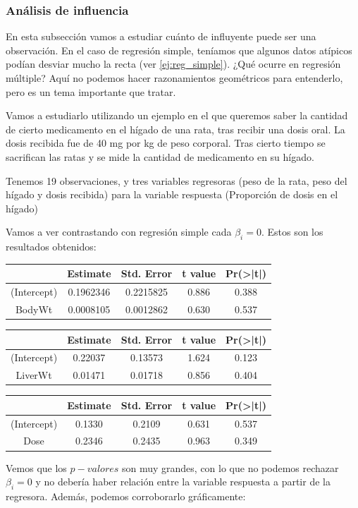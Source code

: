 \subsubsection{Análisis de influencia}

En esta subsección vamos a estudiar cuánto de influyente puede ser una observación. En el caso de regresión simple, teníamos que algunos datos atípicos podían desviar mucho la recta (ver \ref{ej:reg_simple}). ¿Qué ocurre en regresión múltiple? Aquí no podemos hacer razonamientos geométricos para entenderlo, pero es un tema importante que tratar.


Vamos a estudiarlo utilizando un ejemplo en el que queremos saber la cantidad de cierto medicamento en el hígado de una rata, tras recibir una dosis oral. La dosis recibida fue de 40 mg por kg de peso corporal. Tras cierto tiempo se sacrifican las ratas y se mide la cantidad de medicamento en su hígado.

Tenemos 19 observaciones, y tres variables regresoras (peso de la rata, peso del hígado y dosis recibida) para la variable respuesta (Proporción de dosis en el hígado)


Vamos a ver contrastando con regresión simple cada $β_i = 0$. Estos son los resultados obtenidos:
\begin{center}
\begin{tabular}{ccccc}
&Estimate&Std. Error&t value&Pr(>|t|)\\\hline
(Intercept)&0.1962346&0.2215825&0.886&0.388\\
BodyWt&0.0008105&0.0012862&0.630&0.537
\end{tabular}

\begin{tabular}{ccccc}
&Estimate&Std. Error&t value&Pr(>|t|)\\\hline
(Intercept)&0.22037&0.13573&1.624&0.123\\
LiverWt&0.01471&0.01718&0.856&0.404
\end{tabular}

\begin{tabular}{ccccc}
&Estimate&Std. Error&t value&Pr(>|t|) \\\hline
(Intercept)&0.1330&0.2109&0.631&0.537\\
Dose&0.2346&0.2435&0.963&0.349
\end{tabular}
\end{center}
Vemos que los $p-valores$ son muy grandes, con lo que no podemos rechazar $β_i = 0$ y no debería haber relación entre la variable respuesta a partir de la regresora. Además, podemos corroborarlo gráficamente:

